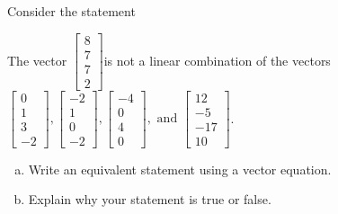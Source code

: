 
\begin{exerciseStatement}


Consider the statement 
\begin{center}\begin{minipage}{0.8\textwidth}
 The vector \( \left[\begin{array}{c}
8 \\
7 \\
7 \\
2
\end{array}\right] \)is not a linear combination of the vectors \( \left[\begin{array}{c}
0 \\
1 \\
3 \\
-2
\end{array}\right] , \left[\begin{array}{c}
-2 \\
1 \\
0 \\
-2
\end{array}\right] , \left[\begin{array}{c}
-4 \\
0 \\
4 \\
0
\end{array}\right] , \text{ and } \left[\begin{array}{c}
12 \\
-5 \\
-17 \\
10
\end{array}\right] \). 
\end{minipage}\end{center}
    


\begin{enumerate}[(a)]
\item  Write an equivalent statement using a vector equation.
\item  Explain why your statement is true or false.
\end{enumerate}
    
\end{exerciseStatement}
    
